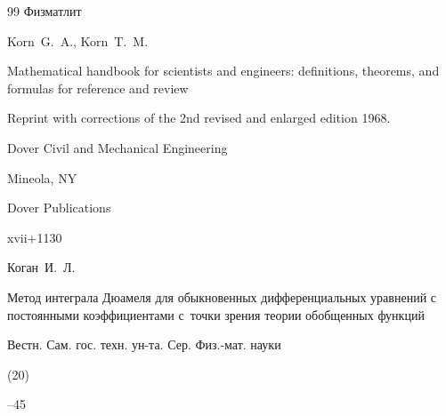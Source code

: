 \begin{thebibliography}{99}
\publ Физматлит
















\by Korn~G.~A., Korn~T.~M.

\book Mathematical handbook for scientists and engineers: definitions, theorems, and formulas for reference and review

\bookinfo Reprint with corrections of the 2nd revised and enlarged edition 1968. 

\serial Dover Civil and Mechanical Engineering

\publaddr Mineola, NY

\publ Dover Publications 

\totalpages xvii+1130 






\by Коган~И.~Л.

\paper Метод интеграла Дюамеля для обыкновенных дифференциальных уравнений с постоянными коэффициентами с~точки зрения теории обобщенных функций

\jour Вестн. Сам. гос. техн. ун-та. Сер. Физ.-мат. науки


(20)

--45







\end{thebibliography}



